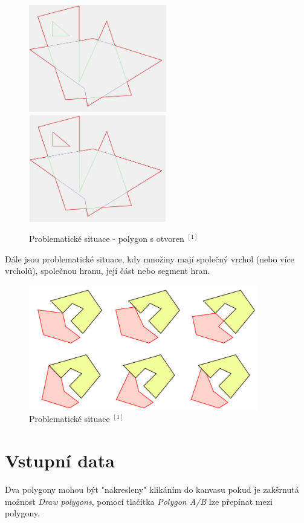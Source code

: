 \documentclass[a4paper, 12pt]{article}
\begin{document}
\begin{figure}[h]
	\centering
	\includegraphics[width=6cm]{emental_sptne.jpg}
	\includegraphics[width=6cm]{emental_spravne.jpg}
	\caption{Problematické situace - polygon s otvoren $^{[1]}$ }
\end{figure}


\noindent Dále jsou problematické situace, kdy množiny mají společný vrchol (nebo více vrcholů), společnou hranu, její část nebo segment hran.\\

\begin{figure}[h]
	\centering
	\includegraphics[width=10cm]{singularity.jpg}
	\caption{Problematické situace $^{[1]}$ }
\end{figure}

\clearpage

\section{Vstupní data}

Dva polygony mohou být "nakresleny" klikáním do kanvasu pokud je zakšrnutá možnost \textit{Draw polygons}, pomocí tlačítka \textit{Polygon A/B} lze přepínat mezi polygony.\\
\end{document}
